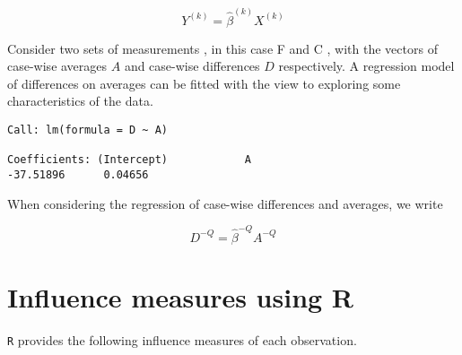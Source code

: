 \documentclass[12pt, a4paper]{article}
\begin{document}
\begin{equation}
Y^{(k)} = \hat{\beta}^{(k)}X^{(k)}
\end{equation}

Consider two sets of measurements , in this case F and C , with the vectors of case-wise averages $A$ and case-wise differences $D$ respectively. A regression model of differences on averages can be fitted with the view to exploring some characteristics of the data.

\begin{verbatim}
Call: lm(formula = D ~ A)

Coefficients: (Intercept)            A
-37.51896      0.04656

\end{verbatim}




When considering the regression of case-wise differences and averages, we write

\begin{equation}
D^{-Q} = \hat{\beta}^{-Q}A^{-Q}
\end{equation}


\section{Influence measures using R} %
\texttt{R} provides the following influence measures of each observation.

\end{document}
